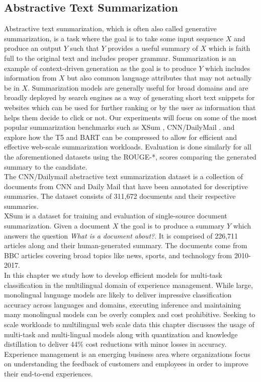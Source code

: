 \subsection{Abstractive Text Summarization}
Abstractive text summarization, which is often also called generative summarization, is a task where the goal is to take some input sequence $X$ and produce an output $Y$ such that $Y$ provides a useful summary of $X$ which is faith full to the original text and includes proper grammar. Summarization is an example of context-driven generation as the goal is to produce $Y$ which includes information from $X$ but also common language attributes that may not actually be in $X$. Summarization models are generally useful for broad domains and are broadly deployed by search engines as a way of generating short text snippets for websites which can be used for further ranking or by the user as information that helps them decide to click or not. Our experiments will focus on some of the most popular summarization benchmarks such as XSum \cite{Narayan2018DontGM}, CNN/DailyMail \cite{Nallapati2016AbstractiveTS}. and explore how the T5 \cite{Raffel2020ExploringTL} and  BART \cite{Lewis2020BARTDS} can be compressed to allow for efficient and effective web-scale summarization workloads. Evaluation is done similarly for all the aforementioned datasets using the ROUGE-*, \cite{Lin2004ROUGEAP} scores comparing the generated summary to the candidate.\\
The CNN/Dailymail abstractive text summarization dataset is a collection of documents from CNN and Daily Mail that have been annotated for descriptive summaries. The dataset consists of 311,672 documents and their respective summaries. \\
XSum is a dataset for training and evaluation of single-source document summarization. Given a document $X$ the goal is to produce a summary $Y$ which answers the question \textit{What is a document about?}. It is comprised of 226,711 articles along and their human-generated summary. The documents come from BBC articles covering broad topics like news, sports, and technology from 2010-2017. \\
In this chapter we study how to develop efficient models for multi-task classification in the multilingual domain of experience management. While large, monolingual language models are likely to deliver impressive classification accuracy across languages and domains, executing inference and maintaining many monolingual models can be overly complex and cost prohibitive. Seeking to scale workloads to multilingual web scale data this chapter discusses the usage of multi-task and multi-lingual models along with quantization and knowledge distillation to deliver 44\% cost reductions with minor losses in accuracy.\\
Experience management is an emerging business area where organizations focus on understanding the feedback of customers and employees in order to improve their end-to-end experiences.

